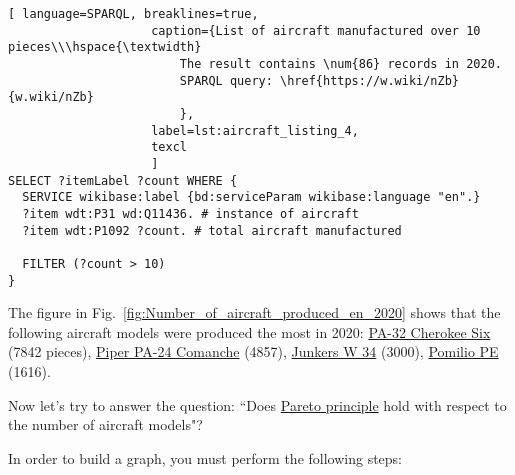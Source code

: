 \begin{lstlisting}[ language=SPARQL, breaklines=true, 
                    caption={List of aircraft manufactured over 10 pieces\\\hspace{\textwidth}
                        The result contains \num{86} records in 2020.
                        SPARQL query: \href{https://w.wiki/nZb}{w.wiki/nZb}
                        },
                    label=lst:aircraft_listing_4,
                    texcl 
                    ]
SELECT ?itemLabel ?count WHERE {
  SERVICE wikibase:label {bd:serviceParam wikibase:language "en".}
  ?item wdt:P31 wd:Q11436. # instance of aircraft
  ?item wdt:P1092 ?count. # total aircraft manufactured
  
  FILTER (?count > 10)
}
\end{lstlisting}

The figure in Fig.~\ref{fig:Number_of_aircraft_produced_en_2020} shows that the following aircraft models were produced the most in 
2020: \href{https://www.wikidata.org/wiki/Q2096452}{PA-32 Cherokee Six} (\num{7842} pieces), \href{https://www.wikidata.org/wiki/Q1860367}{Piper PA-24 Comanche} 
(\num{4857}), \href{https://www.wikidata.org/wiki/Q694521}{Junkers W 34} (\num{3000}), \href{https://www.wikidata.org/wiki/Q941011}{Pomilio PE} 
(\num{1616}).

\begin{figure*}[h]

    \setlength{\fboxsep}{0pt}%
    \setlength{\fboxrule}{1pt}%

	\caption{Number of aircraft produced by model, 2020.}%
    \label{fig:Number_of_aircraft_produced_en_2020}%
\end{figure*}

Now let's try to answer the question: ``Does \href{https://en.wikipedia.org/wiki/Pareto_principle}{Pareto principle} hold with respect to the 
number of aircraft models"?

In order to build a graph, you must perform the following steps:

\label{question:aircraft_question_2}


